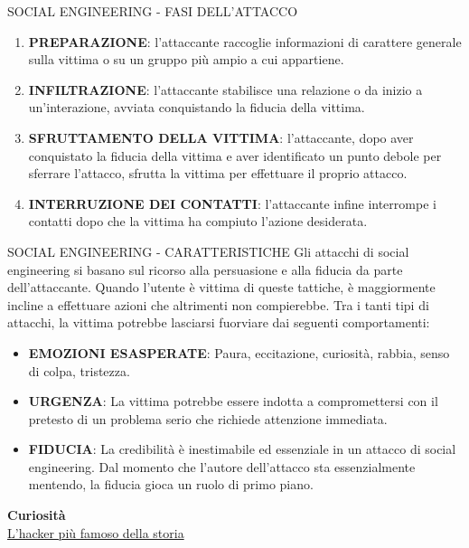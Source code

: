 \documentclass[aspectratio=1610, handout]{beamer}
\begin{document}
\begin{frame}{SOCIAL ENGINEERING - FASI DELL'ATTACCO}
    \begin{enumerate}
        \item \textbf{PREPARAZIONE}: l'attaccante raccoglie informazioni di carattere generale sulla vittima 
        o su un gruppo più ampio a cui appartiene.
        \pause
        \item \textbf{INFILTRAZIONE}: l'attaccante stabilisce una relazione o da inizio a un'interazione, 
        avviata conquistando la fiducia della vittima.
        \pause
        \item \textbf{SFRUTTAMENTO DELLA VITTIMA}: l'attaccante, dopo aver conquistato la fiducia della vittima 
        e aver identificato un punto debole per sferrare l'attacco, sfrutta la vittima per effettuare il proprio attacco.
        \pause
        \item \textbf{INTERRUZIONE DEI CONTATTI}: l'attaccante infine interrompe i contatti dopo che la vittima ha compiuto l'azione desiderata.
    \end{enumerate}
\end{frame}

\begin{frame}{SOCIAL ENGINEERING - CARATTERISTICHE}
    Gli attacchi di social engineering si basano sul ricorso alla persuasione e alla fiducia da parte 
    dell'attaccante. Quando l'utente è vittima di queste tattiche, è maggiormente incline a effettuare 
    azioni che altrimenti non compierebbe. Tra i tanti tipi di attacchi, la vittima potrebbe lasciarsi fuorviare dai 
    seguenti comportamenti:
    \begin{itemize}
        \item \textbf{EMOZIONI ESASPERATE}: Paura, eccitazione, curiosità, rabbia, senso di colpa, tristezza.
        \pause
        \item \textbf{URGENZA}: La vittima potrebbe essere indotta a compromettersi con il pretesto di un problema 
        serio che richiede attenzione immediata.
        \pause
        \item \textbf{FIDUCIA}: La credibilità è inestimabile ed essenziale in un attacco di social engineering. 
        Dal momento che l'autore dell'attacco sta essenzialmente mentendo, la fiducia gioca un ruolo di primo piano.
    \end{itemize}
    \tiny{\textbf{Curiosità}}\\
    \tiny{\href{https://it.wikipedia.org/wiki/Kevin_Mitnick}{L'hacker più famoso della storia}}
\end{frame}
\end{document}
